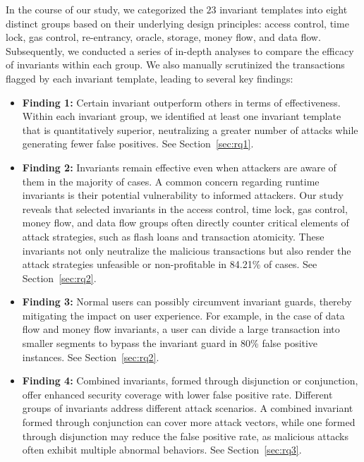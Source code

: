 In the course of our study, we categorized the $23$ invariant templates into
eight distinct groups based on their underlying design principles: access
control, time lock, gas control, re-entrancy, oracle, storage, money flow, 
and data flow. Subsequently, we conducted a series of in-depth analyses to compare
the efficacy of invariants within each group. We also manually scrutinized the
transactions flagged by each invariant template, leading to several key
findings:
\vspace{-1mm}
\begin{itemize}[leftmargin=*]
\item \textbf{Finding 1:} Certain invariant outperform others in
    terms of effectiveness. Within each invariant group, we identified at least one
        invariant template that is quantitatively superior, neutralizing a
        greater number of attacks while generating fewer false positives.
        See Section~\ref{sec:rq1}.

\item \textbf{Finding 2:} Invariants remain effective even when attackers are
    aware of them in the majority of cases. A common concern regarding runtime
        invariants is their potential vulnerability to informed attackers. Our
        study reveals that selected invariants in the access control, time lock,
        gas control,
        money flow, and data flow groups often directly counter critical elements of
        attack strategies, such as flash loans and transaction atomicity. These
        invariants not only neutralize the malicious transactions but also
        render the attack strategies unfeasible or non-profitable in 84.21\% of
        cases. See Section~\ref{sec:rq2}.

\item \textbf{Finding 3:} Normal users can possibly circumvent invariant guards, 
        thereby mitigating the impact on user
        experience. For example, in the case of data flow and money flow
        invariants, a user can divide a large transaction into smaller segments
        to bypass the invariant guard in 80\% false positive instances. 
        See Section~\ref{sec:rq2}.

\item \textbf{Finding 4:} Combined invariants, formed through disjunction or
    conjunction, offer enhanced security coverage with lower false positive rate.
    Different groups of
        invariants address different attack scenarios. A combined invariant
        formed through conjunction can cover more attack vectors, while one
        formed through disjunction may reduce the false positive rate, as
        malicious attacks often exhibit multiple abnormal behaviors. See
        Section~\ref{sec:rq3}.
\end{itemize}
